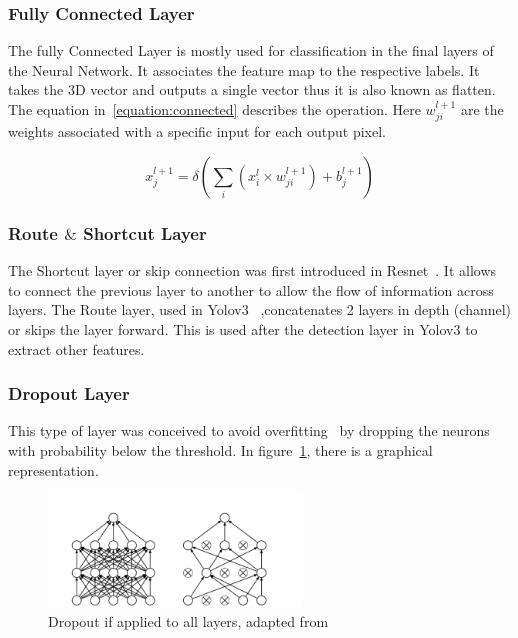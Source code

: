 \subsubsection{Fully Connected Layer}

The fully Connected Layer is mostly used for classification in the final layers
of the Neural Network. It associates the feature map to the respective labels.
It takes the 3D vector and outputs a single vector thus it is also known as
flatten.  The equation in~\ref{equation:connected} describes the operation. Here
$w_{ji}^{l+1}$ are the weights associated with a specific input for each output
pixel.



\begin{equation} \label{equation:connected}
     \displaystyle x_{j}^{l+1}=\delta (\sum_{i}(x_{i}^{l} \times w_{ji}^{l+1})+ b_{j}^{l+1})
 \end{equation}
 

\subsubsection{Route $\&$ Shortcut Layer}

The Shortcut layer or skip connection was first introduced in
Resnet~\cite{resnet}.  It allows to connect the previous layer to another to
allow the flow of information across layers.  The Route layer, used in
Yolov3~\cite{yolov3} ,concatenates 2 layers in depth (channel) or skips the
layer forward. This is used after the detection layer in Yolov3 to extract other
features.

\subsubsection{Dropout Layer}

This type of layer was conceived to avoid overfitting~\cite{Dropout} by dropping
the neurons with probability below the threshold. In
figure~\ref{figure:Dropout}, there is a graphical representation.
\begin{figure}[!htbp]
    \centering
    \includegraphics[width=0.6\textwidth]{Figures/dropout.png}
    \caption{Dropout if applied to all layers, adapted from~\cite{Dropout}}
    \label{figure:Dropout}
\end{figure} 

